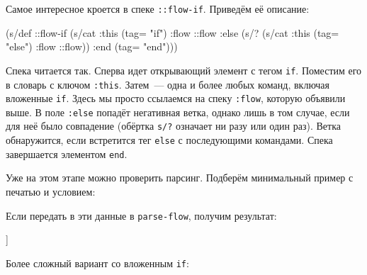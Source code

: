 Самое интересное кроется в спеке \texttt{::flow-if}. Приведём её описание:

\begin{english}
  \begin{clojure}
(s/def ::flow-if
  (s/cat :this (tag= "if")
         :flow ::flow
         :else (s/? (s/cat :this (tag= "else")
                           :flow ::flow))
         :end (tag= "end")))
  \end{clojure}
\end{english}

Спека читается так. Сперва идет открывающий элемент с тегом
\texttt{if}. Поместим его в словарь с ключом \texttt{:this}. Затем~--- одна и
более любых команд, включая вложенные \texttt{if}. Здесь мы просто ссылаемся на
спеку \texttt{:flow}, которую объявили выше. В поле \texttt{:else} попадёт
негативная ветка, однако лишь в том случае, если для неё было совпадение
(обёртка \verb|s/?| означает ни разу или один раз). Ветка обнаружится, если
встретится тег \verb|else| с последующими командами. Спека завершается элементом
\verb|end|.

Уже на этом этапе можно проверить парсинг. Подберём минимальный пример с печатью
и условием:

\begin{english}
  \begin{clojure}
  \end{clojure}
\end{english}

Если передать в эти данные в \texttt{parse-flow}, получим результат:

\begin{english}
  \begin{clojure}
[[:if
  {:this {:command "if" :condition "..."}
   :flow [[:cmd {:command "print" :text "this is true"}]]
   :else
   {:this {:command "else"}
    :flow [[:cmd {:command "print" :text "this is false"}]]}
   :end {:command "end"}}]]
  \end{clojure}
\end{english}

Более сложный вариант со вложенным \texttt{if}:

\begin{english}
  \begin{clojure}
  \end{clojure}
\end{english}

